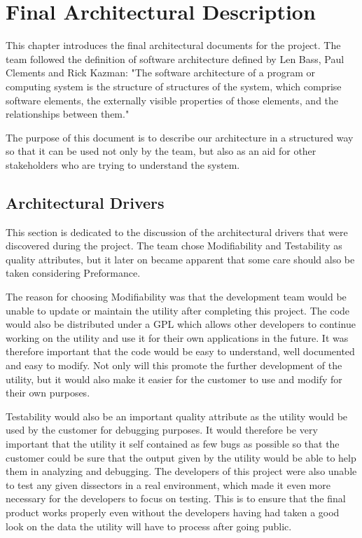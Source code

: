\chapter{Final Architectural Description}
This chapter introduces the final architectural documents for the project. The team followed the definition of software architecture defined by Len Bass, Paul Clements and Rick Kazman: "The software architecture of a program or computing
system is the structure of structures of the system, which comprise software elements, the externally visible properties of those elements, and the relationships between them."\cite{Bass2003}

The purpose of this document is to describe our architecture in a structured way so that it can be used not only by the team, but also as an aid for other stakeholders who are trying to understand the system.

\section{Architectural Drivers}
This section is dedicated to the discussion of the architectural drivers that were discovered during the project.
The team chose Modifiability and Testability as quality attributes, but it later on became apparent that some care should also be taken considering Preformance.

The reason for choosing Modifiability was that the development team would be unable to update or maintain the \gls{utility} after completing this project. The code would also be distributed under a GPL which allows other developers to continue working on the utility and use it for their own applications in the future. It was therefore important that the code would be easy to understand, well documented and easy to modify. Not only will this promote the further development of the utility, but it would also make it easier for the customer to use and modify for their own purposes.

Testability would also be an important quality attribute as the \gls{utility} would be used by the customer for debugging purposes. It would therefore be very important that the utility it self contained as few bugs as possible so that the customer could be sure that the output given by the utility would be able to help them in analyzing and debugging. The developers of this project were also unable to test any given \glspl{dissector} in a real environment, which made it even more necessary for the developers to focus on testing. This is to ensure that the final product works properly even without the developers having had taken a good look on the data the utility will have to process after going public.


